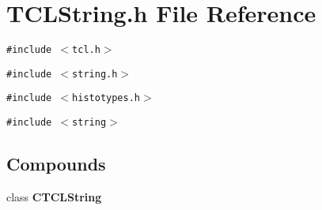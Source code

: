 \section{TCLString.h File Reference}
\label{TCLString_8h}
{\tt \#include $<$tcl.h$>$}\par
{\tt \#include $<$string.h$>$}\par
{\tt \#include $<$histotypes.h$>$}\par
{\tt \#include $<$string$>$}\par
\subsection*{Compounds}
\begin{CompactItemize}
\item 
class {\bf CTCLString}
\end{CompactItemize}
